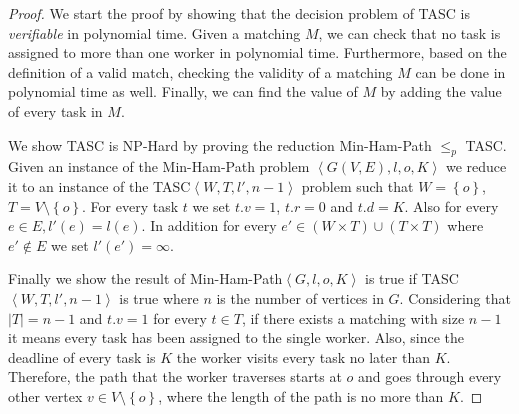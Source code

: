 \begin{proof}
We start the proof by showing that the decision problem of TASC is \textit{verifiable} in polynomial time. Given a matching $M$, we can check that no task is assigned to more than one worker in polynomial time. Furthermore, based on the definition of a valid match, checking the validity of a matching $M$ can be done in polynomial time as well. Finally, we can find the value of $M$ by adding the value of every task in $M$.

We show TASC is NP-Hard by proving the reduction Min-Ham-Path $\leq_p$ TASC. Given an instance of the Min-Ham-Path problem $\left\langle G(V,E), l, o, K \right\rangle$ we reduce it to an instance of the TASC$\left\langle W, T, l', n-1 \right\rangle$ problem such that $W = \left\{ o \right\}$, $T = V \setminus \left\{ o \right\}$. For every task $t$ we set $t.v = 1$, $t.r = 0$ and $t.d = K$. Also for every $e \in E, l'(e) = l(e)$. In addition for every $e' \in \left( W \times T \right) \cup \left( T \times T \right) $ where $e' \not\in E$ we set $l'(e') = \infty$.

Finally we show the result of Min-Ham-Path$\left\langle G, l, o, K \right\rangle$ is true if TASC$\left\langle W, T, l', n-1 \right\rangle$ is true where $n$ is the number of vertices in $G$. Considering that $\left\vert T \right\vert = n - 1$ and $t.v = 1$ for every $t \in T$, if there exists a matching with size $n - 1$ it means every task has been assigned to the single worker. Also, since the deadline of every task is $K$ the worker visits every task no later than $K$. Therefore, the path that the worker traverses starts at $o$ and goes through every other vertex $v \in V \setminus \left\{ o \right\}$, where the length of the path is no more than $K$.
\end{proof}